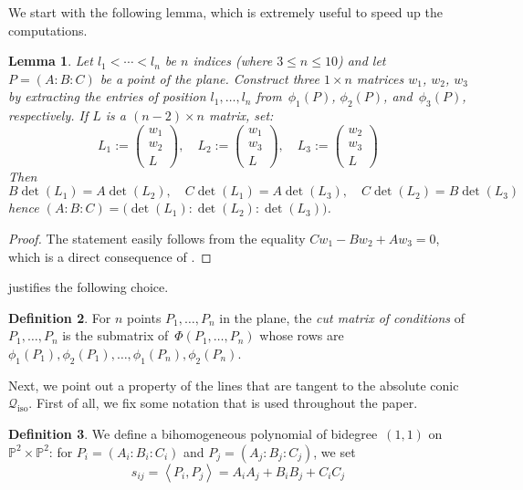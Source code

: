 \documentclass[a4paper, 11pt, reqno]{amsart}
\theoremstyle{plain}
\newtheorem{lemma}{Lemma}[section]
\theoremstyle{definition}
\newtheorem{definition}[lemma]{Definition}
\newcommand{\p}{\mathbb{P}}
\newcommand{\iso}{\mathcal{Q}_{\mathrm{iso}}}
\newcommand{\scl}[2]{\left\langle {#1}, {#2} \right\rangle}
\begin{document}
We start with the following lemma, which is extremely useful
to speed up the computations.

\begin{lemma}
\label{lemma:minors}
Let $l_1 < \cdots <l_n$ be $n$ indices (where $3 \leq n \leq 10$) and let $P = (A: B: C)$ be a point of the plane.
Construct three $1 \times n$ matrices $w_1$, $w_2$, $w_3$ by extracting the entries of position $l_1, \dotsc, l_n$ from~$\phi_1(P)$, $\phi_2(P)$, and~$\phi_3(P)$, respectively. If $L$ is a $(n-2) \times n$ matrix, set:
%
\[
  L_1 := \left( \begin{array}{c} w_1 \\ w_2 \\ L \end{array} \right), \quad
  L_2 := \left( \begin{array}{c} w_1 \\ w_3 \\ L \end{array} \right), \quad
  L_3 := \left( \begin{array}{c} w_2 \\ w_3 \\ L \end{array} \right)
\]
%
Then
%
\[
  B \det(L_1) = A \det(L_2), \quad
  C \det(L_1) = A \det(L_3), \quad
  C \det(L_2) = B \det(L_3)
\]
%
hence $(A: B: C) = \bigl( \det(L_1): \det(L_2): \det(L_3) \bigr)$.
\end{lemma}
\begin{proof}
The statement easily follows from the equality $C w_1 - B w_2 + A w_3 = 0$, which is a direct consequence of .
\end{proof}

 justifies the following choice.

\begin{definition}
\label{definition:reduced_matrix_conditions}
For $n$ points $P_1, \dotsc, P_n$ in the plane, the \emph{cut matrix of conditions} of $P_1, \dotsc, P_n$ is the submatrix of~$\Phi(P_1, \dotsc, P_n)$ whose rows are $\phi_1(P_1), \phi_2(P_1), \dotsc, \phi_1(P_n), \phi_2(P_n)$.
\end{definition}

Next, we point out a property of the lines that are tangent to the absolute conic~$\iso$.
First of all, we fix some notation that is used throughout the paper.

\begin{definition}\label{def: scalar product}
We define a bihomogeneous polynomial of bidegree~$(1,1)$ on $\p^2 \times \p^2$: for $P_i = (A_i: B_i: C_i)$ and $P_j = (A_j: B_j: C_j)$, we set
%
\[
  s_{ij} = \scl{P_i}{P_j} = A_i A_j + B_i B_j + C_i C_j
\]
%
\end{definition}
\end{document}
